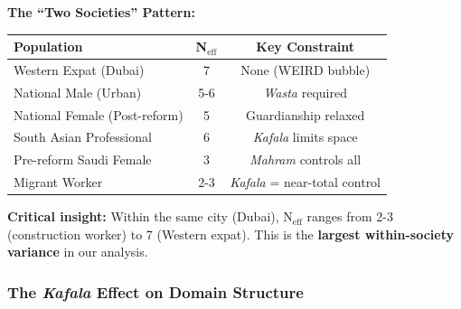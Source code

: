 \begin{tcolorbox}[colback=yellow!5!white, colframe=yellow!75!black, title=Finding: Extreme Bifurcation by Citizenship and Gender]

\textbf{The ``Two Societies'' Pattern:}

\begin{center}
\begin{tabular}{@{}lcc@{}}
\toprule
\textbf{Population} & \textbf{N$_{\text{eff}}$} & \textbf{Key Constraint} \\
\midrule
Western Expat (Dubai) & 7 & None (WEIRD bubble) \\
National Male (Urban) & 5-6 & \textit{Wasta} required \\
National Female (Post-reform) & 5 & Guardianship relaxed \\
South Asian Professional & 6 & \textit{Kafala} limits space \\
Pre-reform Saudi Female & 3 & \textit{Mahram} controls all \\
Migrant Worker & 2-3 & \textit{Kafala} = near-total control \\
\bottomrule
\end{tabular}
\end{center}

\textbf{Critical insight:} Within the same city (Dubai), N$_{\text{eff}}$ ranges from 2-3 (construction worker) to 7 (Western expat). This is the \textbf{largest within-society variance} in our analysis.

\end{tcolorbox}

\subsubsection{The \textit{Kafala} Effect on Domain Structure}

